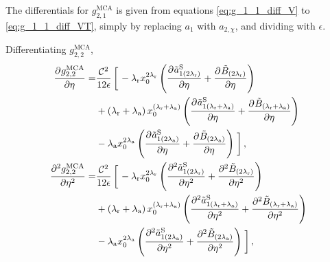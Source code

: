 \documentclass[english]{../thermomemo/thermomemo}
\newcommand*{\pd}[3][]{\frac{\partial^{#1}#2}{\partial{#3}^{#1}}}%
\newcommand*{\lb}{\left(}
\newcommand*{\rb}{\right)}
\newcommand{\mca}{\text{MCA}\xspace}
\newcommand{\hs}{\text{HS}\xspace}
\newcommand{\lama}{\ensuremath{{\lambda_{\text{a}}}}\xspace}
\newcommand{\lamr}{\ensuremath{{\lambda_{\text{r}}}}\xspace}
\newcommand{\Bt}{\ensuremath{\tilde{B}}\xspace}
\newcommand*{\aSlt}[1]{\ensuremath{\tilde{a}_{1{#1}}^{\text{S}}}\xspace}
\begin{document}
The differentials for $g_{2,1}^\mca$ is given from equations
\ref{eq:g_1_1_diff_V} to \ref{eq:g_1_1_diff_VT}, simply by replacing
$a_1$ with $a_{2,\chi}$, and dividing with $\epsilon$.

Differentiating $g_{2,2}^\mca$,
\begin{align}
  \label{eq:g_2_2_diff}
  \pd{g_{2,2}^\mca}{\eta}  =&  \frac{\mathcal{C}^2 }{12 \epsilon} \left[ \vphantom{\frac{K^\hs \mathcal{C}^2 }{12 \epsilon}}  \right. - \lamr x_0^{2\lamr} \lb\pd{\aSlt{\lb 2\lamr\rb}}{\eta} + \pd{\Bt_{\lb 2\lamr\rb}}{\eta}\rb \nonumber \\ & + {\lb\lamr + \lama\rb x_0^{\lb\lamr + \lama\rb} \lb\pd{\aSlt{\lb\lamr + \lama\rb}}{\eta} + \pd{\Bt_{\lb\lamr + \lama \rb}}{\eta}\rb} \nonumber \\
                            & - \lama x_0^{2\lama} \lb\pd{\aSlt{\lb 2\lama\rb}}{\eta} + \pd{\Bt_{\lb2\lama \rb}}{\eta}\rb \left. \vphantom{\frac{K^\hs \mathcal{C}^2 }{12 \epsilon}} \right], \\
    \pd[2]{g_{2,2}^\mca}{\eta}  =& \frac{ \mathcal{C}^2 }{12 \epsilon} \left[ \vphantom{\frac{K^\hs \mathcal{C}^2 }{12 \epsilon}}  \right. - \lamr x_0^{2\lamr} \lb\pd[2]{\aSlt{\lb 2\lamr\rb}}{\eta} + \pd[2]{\Bt_{\lb 2\lamr\rb}}{\eta}\rb \nonumber \\ & + {\lb\lamr + \lama\rb x_0^{\lb\lamr + \lama\rb} \lb\pd[2]{\aSlt{\lb\lamr + \lama\rb}}{\eta} + \pd[2]{\Bt_{\lb\lamr + \lama \rb}}{\eta}\rb} \nonumber \\
                            & - \lama x_0^{2\lama} \lb\pd[2]{\aSlt{\lb 2\lama\rb}}{\eta} + \pd[2]{\Bt_{\lb2\lama \rb}}{\eta}\rb \left. \vphantom{\frac{K^\hs \mathcal{C}^2 }{12 \epsilon}} \right],
\end{align}
\end{document}

